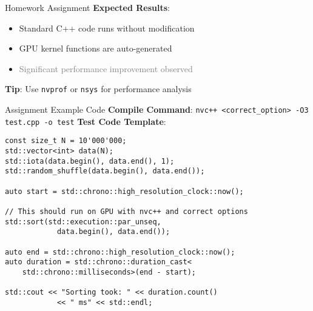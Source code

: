 \begin{frame}{Homework Assignment}
    \textbf{Expected Results}:
    \begin{itemize}
        \item Standard C++ code runs without modification
        \item GPU kernel functions are auto-generated
        \item \textcolor{gray}{Significant performance improvement observed}
    \end{itemize}

    \vspace{0.5em}
    \textbf{Tip}: Use \texttt{nvprof} or \texttt{nsys} for performance analysis
\end{frame}

\begin{frame}[fragile]{Assignment Example Code}
    \textbf{Compile Command}: \verb|nvc++ <correct_option> -O3 test.cpp -o test|
    \textbf{Test Code Template}:

    \begin{verbatim}
const size_t N = 10'000'000;
std::vector<int> data(N);
std::iota(data.begin(), data.end(), 1);
std::random_shuffle(data.begin(), data.end());

auto start = std::chrono::high_resolution_clock::now();

// This should run on GPU with nvc++ and correct options
std::sort(std::execution::par_unseq,
            data.begin(), data.end());

auto end = std::chrono::high_resolution_clock::now();
auto duration = std::chrono::duration_cast<
    std::chrono::milliseconds>(end - start);

std::cout << "Sorting took: " << duration.count()
            << " ms" << std::endl;
    \end{verbatim}

\end{frame}

